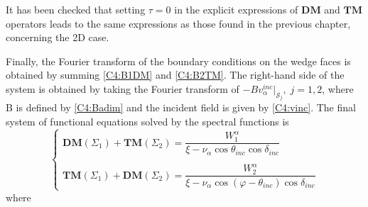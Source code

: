 It has been checked that setting $\tau=0$ in the explicit expressions of $\mathbf{DM}$ and $\mathbf{TM}$ operators leads to the same expressions as those found in the previous chapter, concerning the 2D case.

Finally, the Fourier transform of the boundary conditions on the wedge faces is obtained by summing \eqref{C4:B1DM} and \eqref{C4:B2TM}. The right-hand side of the system is obtained by taking the Fourier transform of $-Bv_{\alpha}^{inc}|_{\mathcal{S}_j}, \; j=1,2$, where B is defined by \eqref{C4:Badim} and the incident field is given by \eqref{C4:vinc}. The final system of functional equations solved by the spectral functions is 
\begin{equation}
\left\{
\begin{matrix}
\textbf{DM}(\Sigma_1)+\textbf{TM}(\Sigma_2)=\dfrac{W_1^{\alpha}}{\xi-\nu_{\alpha} \cos \theta_{inc}\cos\delta_{inc}} 
\\
~\\
\textbf{TM}(\Sigma_1)+\textbf{DM}(\Sigma_2)=\dfrac{W_2^{\alpha}}{\xi-\nu_{\alpha}\cos(\varphi-\theta_{inc})\cos\delta_{inc}}
\end{matrix}
\right.
\label{C4:equationsintegrales}
\end{equation}
where
